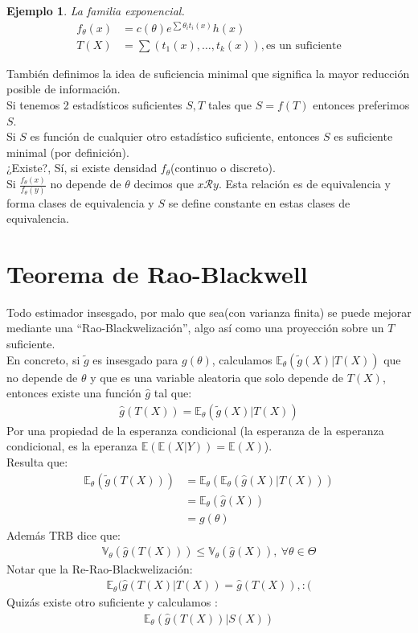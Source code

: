 \documentclass[10pt]{article}
\theoremstyle{plain}
\newtheorem{ej}{Ejemplo}
\theoremstyle{definition}
\begin{document}
\begin{ej} La familia exponencial.\\
\begin{align*}
f_{\theta}(x) &= c(\theta) e^{\sum \theta_{i}t_{i}(x)}h(x)\\
T(X) &= \sum (t_{1}(x), \ldots, t_{k}(x)) , \text{es un suficiente}
\end{align*}
\end{ej}

También definimos la idea de suficiencia minimal que significa la mayor reducción posible de información.\\
Si tenemos 2 estadísticos suficientes $S,T$ tales que $S=f(T)$ entonces preferimos $S$.\\
Si $S$ es función de cualquier otro estadístico suficiente, entonces $S$ es suficiente minimal (por definición).\\
¿Existe?, Sí, si existe densidad $f_{\theta}$(continuo o discreto).\\
Si $\frac{f_{\theta}(x)}{f_{\theta}(y)}$ no depende de $\theta$ decimos que $x\mathcal{R}y$. Esta relación es de equivalencia y forma clases de equivalencia y $S$ se define constante en estas clases de equivalencia.

\section{Teorema de Rao-Blackwell}
Todo estimador insesgado, por malo que sea(con varianza finita) se puede mejorar mediante una ``Rao-Blackwelización'', algo así como una proyección sobre un $T$ suficiente.\\
En concreto, si $\tilde{g}$ es insesgado para $g(\theta)$, calculamos $\mathbb{E}_{\theta}(\tilde{g}(X)|T(X))$ que no depende de $\theta$ y que es una variable aleatoria que solo depende de $T(X)$, entonces existe una función $\hat{g}$ tal que:
\begin{align*}
\hat{g}(T(X)) = \mathbb{E}_{\theta}(\tilde{g}(X)|T(X))
\end{align*}
Por una propiedad de la esperanza condicional (la esperanza de la esperanza condicional, es la eperanza $\mathbb{E}(\mathbb{E}(X|Y)) = \mathbb{E}(X)$). \\
Resulta que:
\begin{align*}
\mathbb{E}_{\theta}(\tilde{g}(T(X))) &= \mathbb{E}_{\theta}(\mathbb{E}_{\theta}(\hat{g}(X)|T(X)))\\
&= \mathbb{E}_{\theta}(\hat{g}(X))\\
&= g(\theta)
\end{align*}
Además TRB dice que:
\begin{align*}
\mathbb{V}_{\theta}(\hat{g}(T(X))) \le \mathbb{V}_{\theta}(\hat{g}(X)),\ \forall \theta \in \Theta
\end{align*}
Notar que la Re-Rao-Blackwelización:
\begin{align*}
\mathbb{E}_{\theta}(\hat{g}(T(X)|T(X)) = \hat{g}(T(X)), :(
\end{align*}
Quizás existe otro suficiente y calculamos :
\begin{align*}
\mathbb{E}_{\theta}(\hat{g}(T(X))|S(X))
\end{align*}
\end{document}
